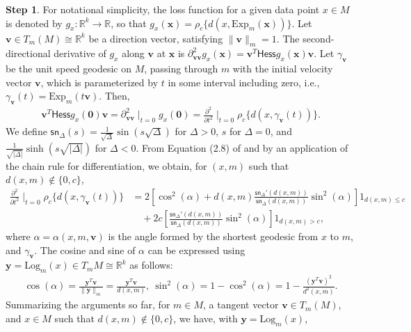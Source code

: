 \documentclass[preprint]{imsart}
\def\vv{\mathbf v}
\def\xv{\mathbf x}
\def\yv{\mathbf y}
\theoremstyle{plain}
\theoremstyle{remark}
\begin{document}
\begin{appendix}
\textbf{Step 1}. 
 For notational simplicity, the loss function for a given data point $x \in M$ is denoted by $g_x: \mathbb{R}^k \to \mathbb{R}$, so that 
$g_x(\xv) = \rho_c\{ d(x, \mbox{Exp}_{m}(\xv))\}$. Let $\vv \in T_m(M) \cong \mathbb{R}^k$ be a direction vector, satisfying $\|\vv\|_{m} = 1$.
The second-directional derivative of $g_x$ along $\vv$ at $\xv$ is 
$\partial_{\vv \vv}^2 g_x(\xv) = \vv^T \textsf{Hess} g_x(\xv) \vv$. 
Let $\gamma_{\vv}$ be the unit speed geodesic on $M$, passing through $m$ with the initial velocity vector $\vv$, which is parameterized by $t$ in some interval including zero, i.e., $\gamma_{\vv}(t) = \mbox{Exp}_m (t\vv)$. Then, 
\begin{align*}
    \vv^T \textsf{Hess}g_x(\mathbf{0}) \vv  = \partial_{\vv \vv}^2 \mid_{t= 0} g_x(\mathbf{0})  = \frac{\partial^2}{\partial t^2 } \mid_{t= 0} \rho_c\{ d(x, \gamma_{\vv}(t))\}.
\end{align*}
We define $\textsf{sn}_{\Delta}(s) = \tfrac{1}{\sqrt{\Delta} }\sin (s\sqrt{\Delta} )$ for $\Delta >0$, 
$s$ for $\Delta =0$, and $\tfrac{1}{\sqrt{|\Delta|} }\sinh (s\sqrt{|\Delta|} )$ for $\Delta <0$. From Equation (2.8) of \cite{afsari2011riemannian} and by an application of the chain rule for differentiation, we obtain, for $(x, m)$ such that $ d(x,m) \notin \{0,c\}$, 
\begin{align*}
    \frac{\partial^2}{\partial t^2 }\mid_{t= 0} \rho_c\{ d(x, \gamma_{\vv}(t))\} & = 
      2\left[ \cos^2(\alpha) + d(x,m)  \frac{\textsf{sn}_{\Delta}'(d(x,m))}{\textsf{sn}_{\Delta}(d(x,m))} \sin^2(\alpha)\right]1_{d(x,m) \le c} \\ 
       &\quad + 
       2c\left[ \frac{\textsf{sn}_{\Delta}'(d(x,m))}{\textsf{sn}_{\Delta}(d(x,m))} \sin^2(\alpha) \right]1_{d(x,m) > c}, 
\end{align*}
where $\alpha = \alpha(x,m,\vv)$ is the angle formed by the shortest geodesic from $x$ to $m$, and $\gamma_{\vv}$. The cosine and sine of $\alpha$ can be expressed using $\yv = \mbox{Log}_{m}(x) \in T_{m}M \cong \mathbb{R}^k$ as follows: 
\begin{align*}
    \cos(\alpha) = \frac{\yv^T \vv  }{ \|\yv\|_{m}} = \frac{\yv^T \vv  }{ d(x,m)}, ~ \sin^2(\alpha) =  1 - \cos^2(\alpha) = 1- \frac{(\yv^T \vv)^2}{d^2(x,m)}.
\end{align*}
Summarizing the arguments so far, for $m \in M$, a tangent vector $\vv \in T_m(M)$, and $x \in M$ such that $d(x, m) \notin \{0,c\}$, we have, with  $\yv = \mbox{Log}_{m}(x)$, 
\begin{equation}
    \label{eq:dir.second.deriv}

\end{equation}
\end{appendix}
\end{document}
